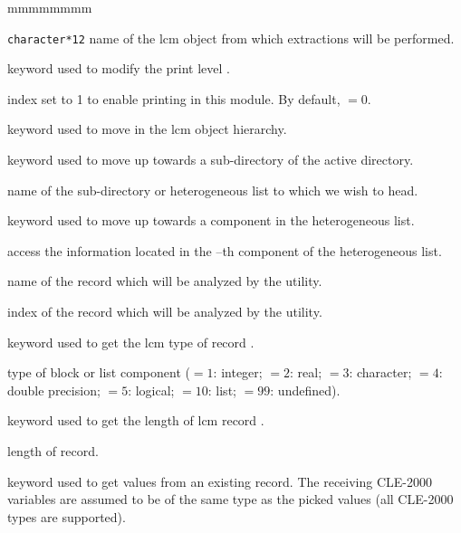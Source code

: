 \begin{ListeDeDescription}{mmmmmmmm}

\item[\dusa{NAME3}] {\tt character*12} name of the {\sc lcm} object from which
extractions will be performed.

\item[\moc{EDIT}] keyword used to modify the print level .

\item[\dusa{iprint}] index set to 1 to enable printing in this module. By default,  $=0$.

\item[\moc{STEP}] keyword used to move in the {\sc lcm} object hierarchy.

\item[\moc{UP}] keyword used to move up towards a sub-directory of the
active directory.

\item[\dusa{NOMDIR}] name of the sub-directory or heterogeneous list to which we wish to head.

\item[\moc{AT}] keyword used to move up towards a component in the heterogeneous list.

\item[\dusa{index}] access the information located in the --th component of the heterogeneous list.

\item[\dusa{BLOCK}] name of the record which will be analyzed by the
 utility.

\item[\dusa{index}] index of the record which will be analyzed by the
 utility.

\item[\moc{TYPE}] keyword used to get the {\sc lcm} type of record .

\item[\dusa{itype}] type of block  or list component  ($=1$: integer;
$=2$: real; $=3$: character; $=4$: double precision; $=5$: logical; $=10$: list; $=99$: undefined).

\item[\moc{LENGTH}] keyword used to get the length of {\sc lcm} record .

\item[\dusa{ilong}] length of record.

\item[\moc{GETVAL}] keyword used to get values from an existing record.
The receiving CLE-2000 variables are assumed to be of the same type as the
picked values (all CLE-2000 types are supported).


\end{ListeDeDescription}
